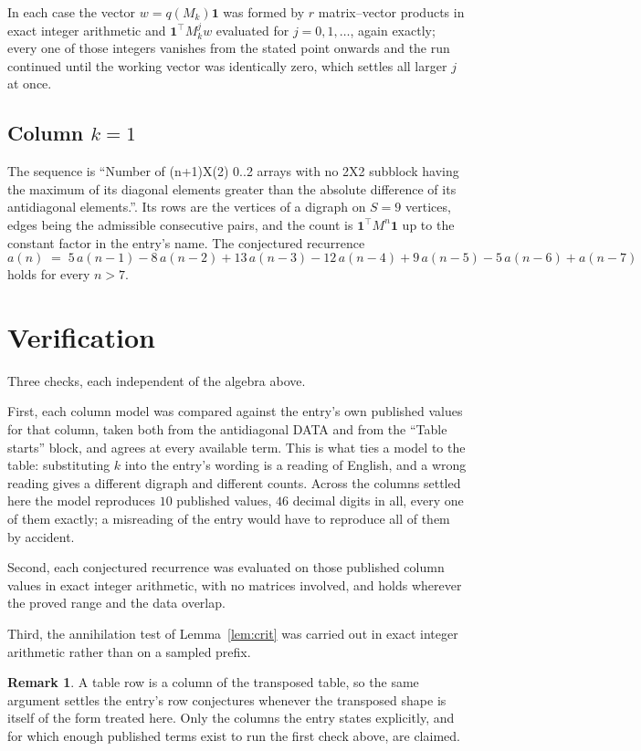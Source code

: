 \documentclass[11pt,a4paper]{article}
\theoremstyle{plain}
\theoremstyle{definition}
\newtheorem{remark}[theorem]{Remark}
\begin{document}
In each case the vector $w=q(M_k)\mathbf{1}$ was formed by $r$ matrix--vector products in
exact integer arithmetic and $\mathbf{1}^{\!\top}M_k^{j}w$ evaluated for $j=0,1,\dots$,
again exactly; every one of those integers vanishes from the stated point onwards and the run
continued until the working vector was identically zero, which settles all larger $j$ at once.

\subsection*{Column $k=1$}
The sequence is ``Number of (n+1)X(2) 0..2 arrays with no 2X2 subblock having the maximum of its diagonal elements greater than the absolute difference of its antidiagonal elements.''. Its rows are the vertices of a digraph on
$S=9$ vertices, edges being the admissible consecutive pairs, and the count is
$\mathbf{1}^{\!\top}M^{n}\mathbf{1}$ up to the constant factor in the entry's name.
The conjectured recurrence
\[
a(n)\;=\;5\,a(n-1) - 8\,a(n-2) + 13\,a(n-3) - 12\,a(n-4) + 9\,a(n-5) - 5\,a(n-6) + a(n-7)
\]
holds for every $n>7$.

\section{Verification}

Three checks, each independent of the algebra above.

First, each column model was compared against the entry's own published values for that
column, taken both from the antidiagonal DATA and from the ``Table starts'' block, and agrees
at every available term. This is what ties a model to the table: substituting $k$ into the
entry's wording is a reading of English, and a wrong reading gives a different digraph and
different counts. Across the columns settled here the model reproduces $10$ published
values, $46$ decimal digits in all, every one of them exactly; a misreading of the entry
would have to reproduce all of them by accident.

Second, each conjectured recurrence was evaluated on those published column values in exact
integer arithmetic, with no matrices involved, and holds wherever the proved range and the
data overlap.

Third, the annihilation test of Lemma~\ref{lem:crit} was carried out in exact integer
arithmetic rather than on a sampled prefix.

\begin{remark}
A table row is a column of the transposed table, so the same argument settles the entry's row
conjectures whenever the transposed shape is itself of the form treated here. Only the columns
the entry states explicitly, and for which enough published terms exist to run the first check
above, are claimed.
\end{remark}
\end{document}

